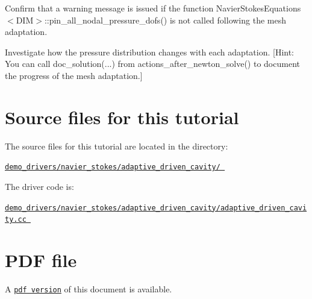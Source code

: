 \begin{DoxyEnumerate}
\item Confirm that a warning message is issued if the function {\ttfamily Navier\+Stokes\+Equations$<$\+D\+I\+M$>$\+::pin\+\_\+all\+\_\+nodal\+\_\+pressure\+\_\+dofs()} is not called following the mesh adaptation.
\item Investigate how the pressure distribution changes with each adaptation. \mbox{[}Hint\+: You can call {\ttfamily doc\+\_\+solution}(...) from {\ttfamily actions\+\_\+after\+\_\+newton\+\_\+solve()} to document the progress of the mesh adaptation.\mbox{]}
\end{DoxyEnumerate}



 

\hypertarget{index_sources}{}\section{Source files for this tutorial}\label{index_sources}

\begin{DoxyItemize}
\item The source files for this tutorial are located in the directory\+: \begin{center} \href{../../../../demo_drivers/navier_stokes/adaptive_driven_cavity/}{\tt demo\+\_\+drivers/navier\+\_\+stokes/adaptive\+\_\+driven\+\_\+cavity/ } \end{center} 
\item The driver code is\+: \begin{center} \href{../../../../demo_drivers/navier_stokes/adaptive_driven_cavity/adaptive_driven_cavity.cc}{\tt demo\+\_\+drivers/navier\+\_\+stokes/adaptive\+\_\+driven\+\_\+cavity/adaptive\+\_\+driven\+\_\+cavity.\+cc } \end{center} 
\end{DoxyItemize}



 

 \hypertarget{index_pdf}{}\section{P\+D\+F file}\label{index_pdf}
A \href{../latex/refman.pdf}{\tt pdf version} of this document is available. 
